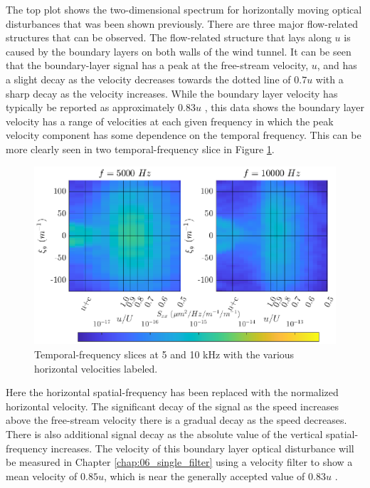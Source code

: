 The top plot shows the two-dimensional spectrum for horizontally moving optical disturbances that was been shown previously.
There are three major flow-related structures that can be observed.
The flow-related structure that lays along $u$ is caused by the boundary layers on both walls of the wind tunnel.
It can be seen that the boundary-layer signal has a peak at the free-stream velocity, $u$, and has a slight decay as the velocity decreases towards the dotted line of $0.7u$ with a sharp decay as the velocity increases.
While the boundary layer velocity has typically be reported as approximately 0.83$u$ \cite{Gordeyev-2014-jcJndkHM}, this data shows the boundary layer velocity has a range of velocities at each given frequency in which the peak velocity component has some dependence on the temporal frequency.
This can be more clearly seen in two temporal-frequency slice in Figure \ref{fig:04_dispersion_slices_velocity}.
\begin{figure}
  \centering
  \includegraphics{../matlab/04_dispersion_analysis/dispersion_slices_velocity.eps}
  \caption{Temporal-frequency slices at 5 and 10 kHz with the various horizontal velocities labeled.}
  \label{fig:04_dispersion_slices_velocity}
\end{figure}
Here the horizontal spatial-frequency has been replaced with the normalized horizontal velocity.
The significant decay of the signal as the speed increases above the free-stream velocity there is a gradual decay as the speed decreases.
There is also additional signal decay as the absolute value of the vertical spatial-frequency increases.
The velocity of this boundary layer optical disturbance will be measured in Chapter \ref{chap:06_single_filter} using a velocity filter to show a mean velocity of $0.85u$, which is near the generally accepted value of $0.83u$ \cite{Gordeyev-2014-jcJndkHM}.

